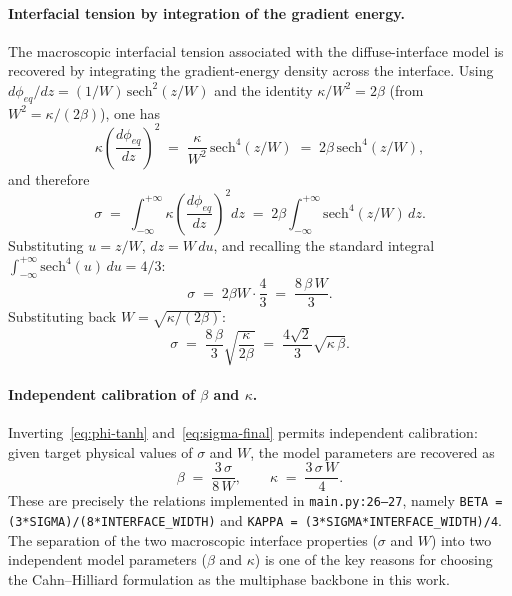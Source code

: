 \paragraph{Interfacial tension by integration of the gradient energy.}
The macroscopic interfacial tension associated with the diffuse-interface model is recovered by integrating the gradient-energy density across the interface.
Using $d\phi_{eq}/dz = (1/W)\,\mathrm{sech}^2(z/W)$ and the identity $\kappa/W^2 = 2\beta$ (from $W^2 = \kappa/(2\beta)$), one has
\begin{equation}
\kappa\!\left(\frac{d\phi_{eq}}{dz}\right)^{\!2}
\;=\; \frac{\kappa}{W^2}\,\mathrm{sech}^4(z/W)
\;=\; 2\beta\,\mathrm{sech}^4(z/W),
\end{equation}
and therefore
\begin{equation}
\sigma \;=\; \int_{-\infty}^{+\infty}\!\kappa\!\left(\frac{d\phi_{eq}}{dz}\right)^{\!2}\!dz
\;=\; 2\beta \int_{-\infty}^{+\infty}\!\mathrm{sech}^4(z/W)\,dz.
\end{equation}
Substituting $u = z/W$, $dz = W\,du$, and recalling the standard integral $\int_{-\infty}^{+\infty}\mathrm{sech}^4(u)\,du = 4/3$:
\begin{equation}
\sigma \;=\; 2\beta W \cdot \frac{4}{3} \;=\; \frac{8\,\beta\,W}{3}.
\end{equation}
Substituting back $W = \sqrt{\kappa/(2\beta)}$:
\begin{equation}
\label{eq:sigma-final}
\boxed{\;\sigma \;=\; \frac{8\,\beta}{3}\sqrt{\frac{\kappa}{2\beta}}
\;=\; \frac{4\sqrt{2}}{3}\sqrt{\kappa\,\beta}.\;}
\end{equation}

\paragraph{Independent calibration of $\beta$ and $\kappa$.}
Inverting~\eqref{eq:phi-tanh} and~\eqref{eq:sigma-final} permits independent calibration: given target physical values of $\sigma$ and $W$, the model parameters are recovered as
\begin{equation}
\label{eq:beta-kappa-from-sigma-W}
\boxed{\;\beta \;=\; \frac{3\,\sigma}{8\,W},\qquad \kappa \;=\; \frac{3\,\sigma\,W}{4}.\;}
\end{equation}
These are precisely the relations implemented in \texttt{main.py:26--27}, namely \texttt{BETA = (3*SIGMA)/(8*INTERFACE\_WIDTH)} and \texttt{KAPPA = (3*SIGMA*INTERFACE\_WIDTH)/4}.
The separation of the two macroscopic interface properties ($\sigma$ and $W$) into two independent model parameters ($\beta$ and $\kappa$) is one of the key reasons for choosing the Cahn--Hilliard formulation as the multiphase backbone in this work.

